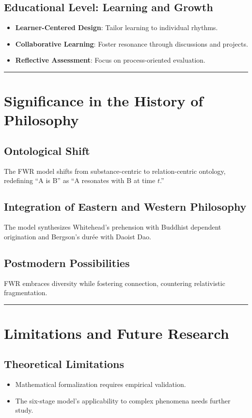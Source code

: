 \documentclass{article}
\begin{document}
\subsection{Educational Level: Learning and Growth}
\begin{itemize}
    \item \textbf{Learner-Centered Design}: Tailor learning to individual rhythms.
    \item \textbf{Collaborative Learning}: Foster resonance through discussions and projects.
    \item \textbf{Reflective Assessment}: Focus on process-oriented evaluation.
\end{itemize}

\hrule

\section{Significance in the History of Philosophy}

\subsection{Ontological Shift}
The FWR model shifts from substance-centric to relation-centric ontology, redefining “A is B” as “A resonates with B at time $t$.”

\subsection{Integration of Eastern and Western Philosophy}
The model synthesizes Whitehead’s prehension with Buddhist dependent origination and Bergson’s durée with Daoist Dao.

\subsection{Postmodern Possibilities}
FWR embraces diversity while fostering connection, countering relativistic fragmentation.

\hrule

\section{Limitations and Future Research}

\subsection{Theoretical Limitations}
\begin{itemize}
    \item Mathematical formalization requires empirical validation.
    \item The six-stage model’s applicability to complex phenomena needs further study.
\end{itemize}
\end{document}
